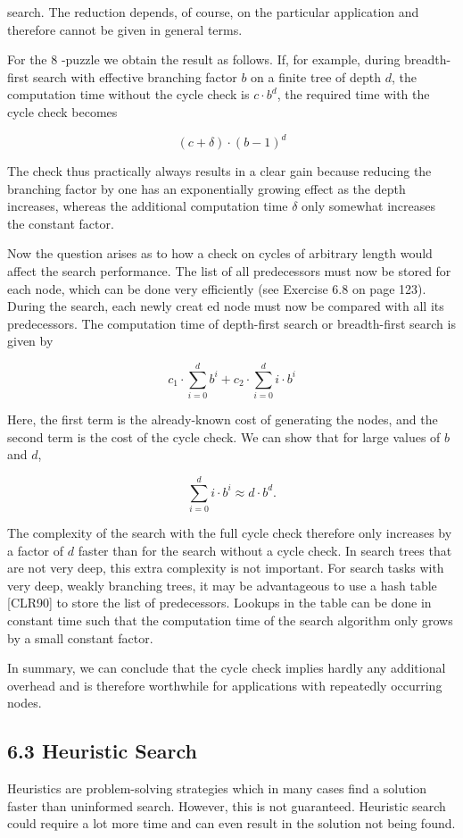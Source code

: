 \documentclass[10pt]{article}
\begin{document}
search. The reduction depends, of course, on the particular application and therefore cannot be given in general terms.

For the 8 -puzzle we obtain the result as follows. If, for example, during breadth-first search with effective branching factor $b$ on a finite tree of depth $d$, the computation time without the cycle check is $c \cdot b^{d}$, the required time with the cycle check becomes

$$
(c+\delta) \cdot(b-1)^{d}
$$

The check thus practically always results in a clear gain because reducing the branching factor by one has an exponentially growing effect as the depth increases, whereas the additional computation time $\delta$ only somewhat increases the constant factor.

Now the question arises as to how a check on cycles of arbitrary length would affect the search performance. The list of all predecessors must now be stored for each node, which can be done very efficiently (see Exercise 6.8 on page 123). During the search, each newly creat
ed node must now be compared with all its predecessors. The computation time of depth-first search or breadth-first search is given by

$$
c_{1} \cdot \sum_{i=0}^{d} b^{i}+c_{2} \cdot \sum_{i=0}^{d} i \cdot b^{i}
$$

Here, the first term is the already-known cost of generating the nodes, and the second term is the cost of the cycle check. We can show that for large values of $b$ and $d$,

$$
\sum_{i=0}^{d} i \cdot b^{i} \approx d \cdot b^{d} .
$$

The complexity of the search with the full cycle check therefore only increases by a factor of $d$ faster than for the search without a cycle check. In search trees that are not very deep, this extra complexity is not important. For search tasks with very deep, weakly branching trees, it may be advantageous to use a hash table [CLR90] to store the list of predecessors. Lookups in the table can be done in constant time such that the computation time of the search algorithm only grows by a small constant factor.

In summary, we can conclude that the cycle check implies hardly any additional overhead and is therefore worthwhile for applications with repeatedly occurring nodes.

\subsection*{6.3 Heuristic Search}
Heuristics are problem-solving strategies which in many cases find a solution faster than uninformed search. However, this is not guaranteed. Heuristic search could require a lot more time and can even result in the solution not being found.
\end{document}
